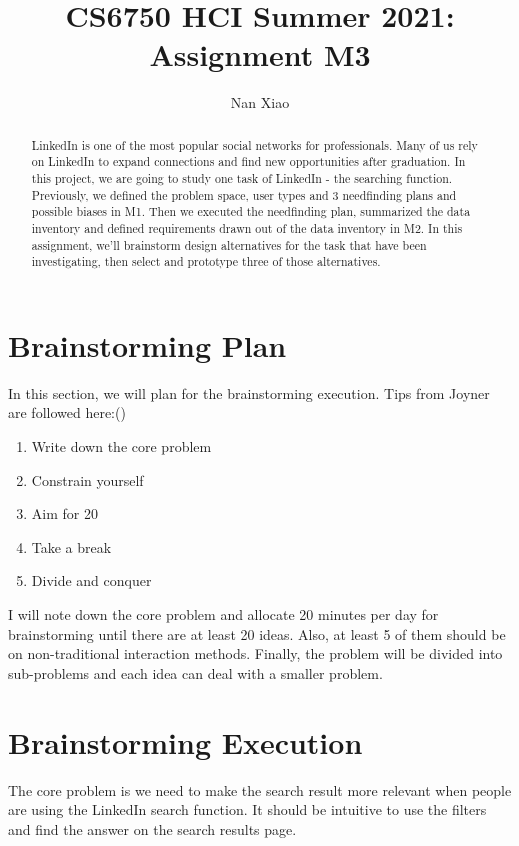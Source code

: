 \documentclass[
	letterpaper, %
]{jdf}
\author{Nan Xiao}
\title{CS6750 HCI Summer 2021:\\Assignment M3}
\begin{document}

\maketitle

\begin{abstract}
	LinkedIn is one of the most popular social networks for professionals. Many of us rely on LinkedIn to expand connections and find new opportunities after graduation. In this project, we are going to study one task of LinkedIn - the searching function. Previously, we defined the problem space, user types and 3 needfinding plans and possible biases in M1. Then we executed the needfinding plan, summarized the data inventory and defined requirements drawn out of the data inventory in M2. In this assignment, we’ll brainstorm design alternatives for the task that have been investigating, then select and prototype three of those alternatives.
\end{abstract}

\section{Brainstorming Plan}

In this section, we will plan for the brainstorming execution. Tips from Joyner are followed here:(\cite{joyner2016a})

\begin{enumerate}
    \item Write down the core problem
    \item Constrain yourself
    \item Aim for 20
    \item Take a break
    \item Divide and conquer
\end{enumerate}

I will note down the core problem and allocate 20 minutes per day for brainstorming until there are at least 20 ideas. Also, at least 5 of them should be on non-traditional interaction methods. Finally, the problem will be divided into sub-problems and each idea can deal with a smaller problem.

\section{Brainstorming Execution}
The core problem is we need to make the search result more relevant when people are using the LinkedIn search function. It should be intuitive to use the filters and find the answer on the search results page.
\end{document}
